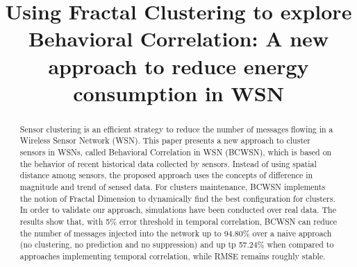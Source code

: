 \documentclass{acm_proc_article-sp}
\begin{document}
%

\title{Using Fractal Clustering to explore Behavioral Correlation: A new
approach to reduce energy consumption in WSN}



\maketitle


\begin{abstract}

Sensor clustering is an efficient strategy to reduce the number of messages
flowing in a Wireless Sensor Network (WSN).
This paper presents a new approach to cluster sensors in WSNs, called
Behavioral Correlation in WSN (BCWSN), which is based on the behavior of recent
historical data collected by sensors. Instead of using spatial distance among
sensors, the proposed approach uses the concepts of difference in magnitude and
trend of sensed data. For clusters maintenance, BCWSN implements the notion of
Fractal Dimension to dynamically find the best configuration for clusters. In
order to validate our approach, simulations have been conducted over real data.
The results show that, with 5\% error threshold in temporal correlation, BCWSN
can reduce the number of messages injected into the network up to 94.80\% over a
naive approach (no clustering, no prediction and no suppression) and up tp
57.24\% when compared to approaches implementing temporal correlation, while
RMSE remains roughly stable.

\end{abstract}

\end{document}
